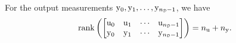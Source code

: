 

\begin{assumption}\label{assum:output}
For the output measurements    
$\vcy_0,\vcy_1,\ldots,\vcy_{\nsmD-1}$, 
we have 
\begin{equation} \label{eqn:rank_y_i_s}
    \rank\left(
    \begin{bmatrix} 
    \vcu_0  & \vcu_1 & \cdots & \vcu_{\nsmD-1}\\
    \vcy_0  & \vcy_1 & \cdots & \vcy_{\nsmD-1}
    \end{bmatrix}
    \right) = \Nu + \Ny.
\end{equation}
\end{assumption}

